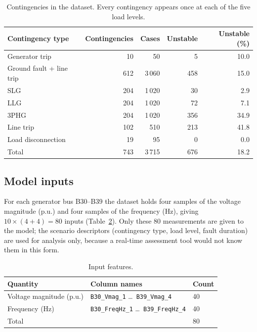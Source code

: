 \documentclass[11pt,a4paper]{article}
\newcommand{\code}[1]{\texttt{#1}}
\begin{document}
\begin{table}[htbp]
\centering
\caption{Contingencies in the dataset. Every contingency appears once at each of the five load levels.}
\label{tab:scenarios}
\begin{tabular}{lrrrr}
\toprule
Contingency type & Contingencies & Cases & Unstable & Unstable (\%) \\
\midrule
Generator trip                  & 10  & 50     & 5   & 10.0 \\
Ground fault + line trip        & 612 & 3\,060 & 458 & 15.0 \\
\quad SLG                       & 204 & 1\,020 & 30  & 2.9 \\
\quad LLG                       & 204 & 1\,020 & 72  & 7.1 \\
\quad 3PHG                      & 204 & 1\,020 & 356 & 34.9 \\
Line trip                       & 102 & 510    & 213 & 41.8 \\
Load disconnection              & 19  & 95     & 0   & 0.0 \\
\midrule
Total                           & 743 & 3\,715 & 676 & 18.2 \\
\bottomrule
\end{tabular}
\end{table}

\subsection{Model inputs}
For each generator bus B30--B39 the dataset holds four samples of the voltage magnitude (p.u.) and four samples of
the frequency (Hz), giving $10 \times (4+4) = 80$ inputs (Table~\ref{tab:features}). Only these 80 measurements are
given to the model; the scenario descriptors (contingency type, load level, fault duration) are used for analysis only,
because a real-time assessment tool would not know them in this form.

\begin{table}[htbp]
\centering
\caption{Input features.}
\label{tab:features}
\begin{tabular}{lll}
\toprule
Quantity & Column names & Count \\
\midrule
Voltage magnitude (p.u.) & \code{B30\_Vmag\_1} \dots\ \code{B39\_Vmag\_4}     & 40 \\
Frequency (Hz)           & \code{B30\_FreqHz\_1} \dots\ \code{B39\_FreqHz\_4} & 40 \\
\midrule
Total & & 80 \\
\bottomrule
\end{tabular}
\end{table}
\end{document}
